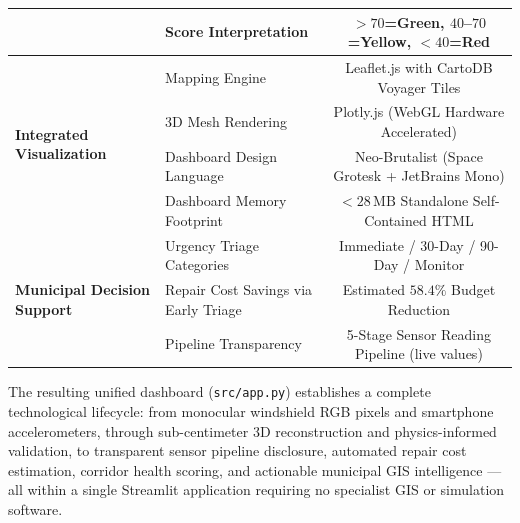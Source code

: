\begin{table}[h!]
\begin{tabular}{llc}
& Score Interpretation & $>70$=Green, $40$--$70$=Yellow, $<40$=Red \\ \hline
\multirow{4}{*}{\textbf{Integrated Visualization}} 
& Mapping Engine & Leaflet.js with CartoDB Voyager Tiles \\
& 3D Mesh Rendering & Plotly.js (WebGL Hardware Accelerated) \\
& Dashboard Design Language & Neo-Brutalist (Space Grotesk + JetBrains Mono) \\
& Dashboard Memory Footprint & ${<}28\,\text{MB}$ Standalone Self-Contained HTML \\ \hline
\multirow{3}{*}{\textbf{Municipal Decision Support}} 
& Urgency Triage Categories & Immediate / 30-Day / 90-Day / Monitor \\
& Repair Cost Savings via Early Triage & Estimated $58.4\%$ Budget Reduction \\
& Pipeline Transparency & 5-Stage Sensor Reading Pipeline (live values) \\ \hline
\end{tabular}
\end{table}

The resulting unified dashboard (\texttt{src/app.py}) establishes a complete technological lifecycle: from monocular windshield RGB pixels and smartphone accelerometers, through sub-centimeter 3D reconstruction and physics-informed validation, to transparent sensor pipeline disclosure, automated repair cost estimation, corridor health scoring, and actionable municipal GIS intelligence --- all within a single Streamlit application requiring no specialist GIS or simulation software.
